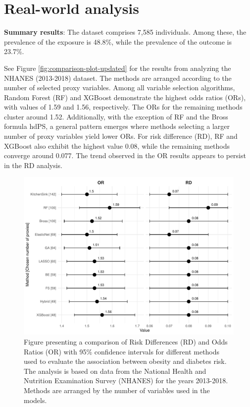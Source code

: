 \documentclass[sn-vancouver,Numbered,lineno,pdflatex]{sn-jnl}
\begin{document}
\section{Real-world analysis}\label{real-world-analysis}

\textbf{Summary results}: The dataset comprises 7,585 individuals. Among
these, the prevalence of the exposure is 48.8\%, while the prevalence of
the outcome is 23.7\%.

See Figure \ref{fig:comparison-plot-updated} for the results from
analyzing the NHANES (2013-2018) dataset. The methods are arranged
according to the number of selected proxy variables. Among all variable
selection algorithms, Random Forest (RF) and XGBoost demonstrate the
highest odds ratios (ORs), with values of 1.59 and 1.56, respectively.
The ORs for the remaining methods cluster around 1.52. Additionally,
with the exception of RF and the Bross formula hdPS, a general pattern
emerges where methods selecting a larger number of proxy variables yield
lower ORs. For risk difference (RD), RF and XGBoost also exhibit the
highest value 0.08, while the remaining methods converge around 0.077.
The trend observed in the OR results appears to persist in the RD
analysis.

\begin{figure}[th]

{\centering \includegraphics[width=1\linewidth,]{manuscript_files/figure-latex/unnamed-chunk-3-1} 

}

\caption{Figure presenting a comparison of Risk Differences (RD) and Odds Ratios (OR) with 95\% confidence intervals for different methods used to evaluate the association between obesity and diabetes risk. The analysis is based on data from the National Health and Nutrition Examination Survey (NHANES) for the years 2013-2018. Methods are arranged by the number of variables used in the models.\label{fig:comparison-plot-updated}}\label{fig:unnamed-chunk-3}
\end{figure}
\end{document}
